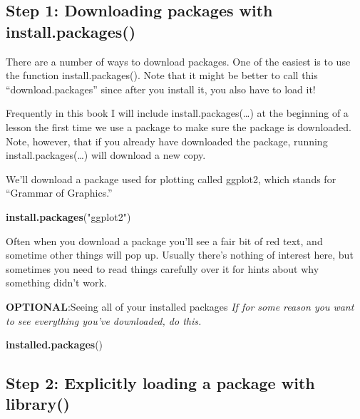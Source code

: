\documentclass[]{book}
\newenvironment{Shaded}{\begin{snugshade}}{\end{snugshade}}
\newcommand{\KeywordTok}[1]{\textcolor[rgb]{0.13,0.29,0.53}{\textbf{#1}}}
\newcommand{\StringTok}[1]{\textcolor[rgb]{0.31,0.60,0.02}{#1}}
\newcommand{\NormalTok}[1]{#1}
\theoremstyle{definition}
\theoremstyle{definition}
\theoremstyle{definition}
\theoremstyle{remark}
\begin{document}
\subsection{\texorpdfstring{\protect\hyperlink{section-3}{} Step 1:
Downloading packages with
install.packages()}{ Step 1: Downloading packages with install.packages()}}\label{step-1-downloading-packages-with-install.packages}

There are a number of ways to download packages. One of the easiest is
to use the function install.packages(). Note that it might be better to
call this ``download.packages'' since after you install it, you also
have to load it!

Frequently in this book I will include install.packages(\ldots{}) at the
beginning of a lesson the first time we use a package to make sure the
package is downloaded. Note, however, that if you already have
downloaded the package, running install.packages(\ldots{}) will download
a new copy.

We'll download a package used for plotting called ggplot2, which stands
for ``Grammar of Graphics.''

\begin{Shaded}
\begin{Highlighting}[]
\KeywordTok{install.packages}\NormalTok{(}\StringTok{"ggplot2"}\NormalTok{)}
\end{Highlighting}
\end{Shaded}

Often when you download a package you'll see a fair bit of red text, and
sometime other things will pop up. Usually there's nothing of interest
here, but sometimes you need to read things carefully over it for hints
about why something didn't work.

\textbf{OPTIONAL}:Seeing all of your installed packages \emph{If for
some reason you want to see everything you've downloaded, do this.}

\begin{Shaded}
\begin{Highlighting}[]
\KeywordTok{installed.packages}\NormalTok{()}
\end{Highlighting}
\end{Shaded}

\subsection{\texorpdfstring{\protect\hyperlink{section-3}{} Step 2:
Explicitly loading a package with
library()}{ Step 2: Explicitly loading a package with library()}}\label{step-2-explicitly-loading-a-package-with-library}
\end{document}
